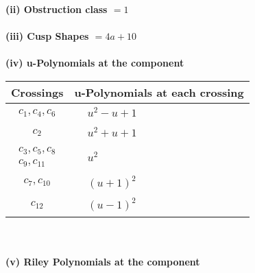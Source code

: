 \documentclass[1p]{elsarticle_modified}
\theoremstyle{definition}
\begin{document}
\flushleft \textbf{(ii) Obstruction class $= 1$}\\~\\
\flushleft \textbf{(iii) Cusp Shapes $= 4 a+10$}\\~\\
\newpage\renewcommand{\arraystretch}{1}
\flushleft \textbf{(iv) u-Polynomials at the component}\newline \\
\begin{tabular}{m{50pt}|m{274pt}}
Crossings & \hspace{64pt}u-Polynomials at each crossing \\
\hline $$\begin{aligned}c_{1},c_{4},c_{6}\end{aligned}$$&$\begin{aligned}
&u^2- u+1
\end{aligned}$\\
\hline $$\begin{aligned}c_{2}\end{aligned}$$&$\begin{aligned}
&u^2+u+1
\end{aligned}$\\
\hline $$\begin{aligned}c_{3},c_{5},c_{8}\\c_{9},c_{11}\end{aligned}$$&$\begin{aligned}
&u^2
\end{aligned}$\\
\hline $$\begin{aligned}c_{7},c_{10}\end{aligned}$$&$\begin{aligned}
&(u+1)^2
\end{aligned}$\\
\hline $$\begin{aligned}c_{12}\end{aligned}$$&$\begin{aligned}
&(u-1)^2
\end{aligned}$\\
\hline
\end{tabular}\\~\\
\newpage\renewcommand{\arraystretch}{1}
\flushleft \textbf{(v) Riley Polynomials at the component}\newline \\
\end{document}
